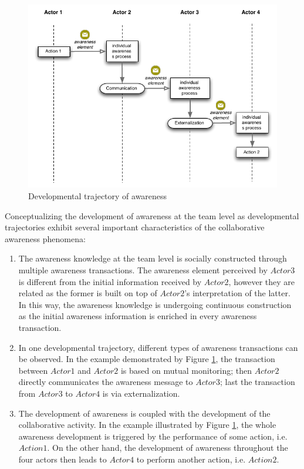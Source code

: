 \begin{figure}[htbp] %
   \centering
   \includegraphics{developmental_trajectory.pdf} 
   \caption{Developmental trajectory of awareness}
   \label{fig:developmental_trajectory}
\end{figure}

Conceptualizing the development of awareness at the team level as developmental trajectories exhibit several important characteristics of the collaborative awareness phenomena:

\begin{enumerate}
	\item The awareness knowledge at the team level is socially constructed through multiple awareness transactions. The awareness element perceived by $Actor3$ is different from the initial information received by $Actor2$, however they are related as the former is built on top of $Actor2$'s interpretation of the latter. In this way, the awareness knowledge is undergoing continuous construction as the initial awareness information is enriched in every awareness transaction.
	\item In one developmental trajectory, different types of awareness transactions can be observed. In the example demonstrated by Figure \ref{fig:developmental_trajectory}, the transaction between $Actor1$ and $Actor2$ is based on mutual monitoring; then $Actor2$ directly communicates the awareness message to $Actor3$; last the transaction from $Actor3$ to $Actor4$ is via externalization. 
	\item The development of awareness is coupled with the development of the collaborative activity. In the example illustrated by Figure \ref{fig:developmental_trajectory}, the whole awareness development is triggered by the performance of some action, i.e. $Action1$. On the other hand, the development of awareness throughout the four actors then leads to $Actor4$ to perform another action, i.e. $Action2$. 
\end{enumerate}

